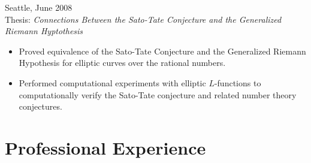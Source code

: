 \documentclass{article}
\begin{document}
\begin{itemize}
    Seattle, June 2008 \\ Thesis: {\it Connections Between the Sato-Tate
      Conjecture and the Generalized Riemann
      Hyptothesis} %
   \begin{itemize}
   \item Proved equivalence of the Sato-Tate Conjecture and the Generalized
     Riemann Hypothesis for elliptic curves over the rational numbers.
   \item Performed computational experiments with elliptic $L$-functions to
     computationally verify the Sato-Tate conjecture and related number theory
     conjectures.
   \end{itemize}
\end{itemize}


\section*{Professional Experience}
\end{document}
